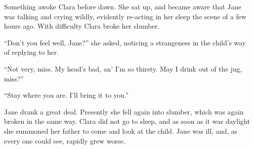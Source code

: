 Something awoke Clara before dawn. She sat up, and became aware that
Jane was talking and crying wildly, evidently re-acting in her sleep the
scene of a few hours ago. With difficulty Clara broke her slumber.

``Don't you feel well, Jane?'' she asked, noticing a strangeness in the
child's way of replying to her.

``Not very, miss. My head's bad, an' I'm so thirsty. May I drink out of
the jug, miss?''

``Stay where you are. I'll bring it to you.''

Jane drank a great deal. Presently she fell again into slumber, which
was again broken in the same way. Clara did not go to sleep, and as soon
as it was daylight she summoned her father to come and look at the
child. Jane was ill, and, as every one could see, rapidly grew worse.
